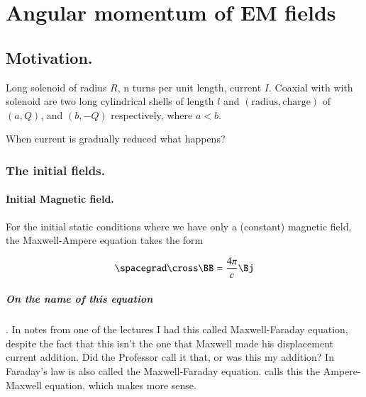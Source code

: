 %
%

\chapter{Angular momentum of EM fields}
\label{chap:relativisticElectrodynamicsT5}
{}
\date{Mar 10, 2011}

\beginArtWithToc

\section{Motivation.}

Long solenoid of radius $R$, n turns per unit length, current $I$.  Coaxial with with solenoid are two long cylindrical shells of length $l$ and $(\text{radius},\text{charge})$ of $(a, Q)$, and $(b, -Q)$ respectively, where $a < b$.

When current is gradually reduced what happens?

\subsection{The initial fields.}
\subsubsection{Initial Magnetic field.}

For the initial static conditions where we have only a (constant) magnetic field, the Maxwell-Ampere equation takes the form

\begin{equation}\label{eqn:relativisticElectrodynamicsT5:10}
\spacegrad \cross \BB = \frac{4 \pi}{c} \Bj
\end{equation}

\paragraph{On the name of this equation}.  In notes from one of the lectures I had this called Maxwell-Faraday equation, despite the fact that this isn't the one that Maxwell made his displacement current addition.  Did the Professor call it that, or was this my addition?  In \citep{wiki:Faraday} Faraday's law is also called the Maxwell-Faraday equation.  \citep{fleisch2007ssg} calls this the Ampere-Maxwell equation, which makes more sense.

